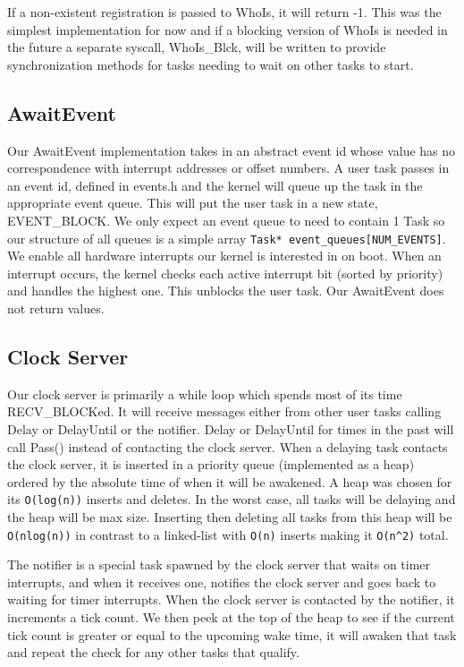 \documentclass[letterpaper]{article}
\begin{document}
If a non-existent registration is passed to WhoIs, it will return -1. This was the simplest implementation for now and if a blocking version of WhoIs is needed in the future a separate syscall, WhoIs\_Blck, will be written to provide synchronization methods for tasks needing to wait on other tasks to start.

\subsection{AwaitEvent}

Our AwaitEvent implementation takes in an abstract event id whose value has no correspondence with interrupt addresses or offset numbers. A user task passes in an event id, defined in events.h and the kernel will queue up the task in the appropriate event queue. This will put the user task in a new state, EVENT\_BLOCK. We only expect an event queue to need to contain 1 Task so our structure of all queues is a simple array \verb!Task* event_queues[NUM_EVENTS]!. We enable all hardware interrupts our kernel is interested in on boot. When an interrupt occurs, the kernel checks each active interrupt bit (sorted by priority) and handles the highest one. This unblocks the user task. Our AwaitEvent does not return values.

\subsection{Clock Server}

Our clock server is primarily a while loop which spends most of its time RECV\_BLOCKed. It will receive messages either from other user tasks calling Delay or DelayUntil or the notifier. Delay or DelayUntil for times in the past will call Pass() instead of contacting the clock server. When a delaying task contacts the clock server, it is inserted in a priority queue (implemented as a heap) ordered by the absolute time of when it will be awakened. A heap was chosen for its \verb!O(log(n))! inserts and deletes. In the worst case, all tasks will be delaying and the heap will be max size. Inserting then deleting all tasks from this heap will be \verb!O(nlog(n))! in contrast to a linked-list with \verb!O(n)! inserts making it \verb!O(n^2)! total.

The notifier is a special task spawned by the clock server that waits on timer interrupts, and when it receives one, notifies the clock server and goes back to waiting for timer interrupts. When the clock server is contacted by the notifier, it increments a tick count. We then peek at the top of the heap to see if the current tick count is greater or equal to the upcoming wake time, it will awaken that task and repeat the check for any other tasks that qualify.
\end{document}
